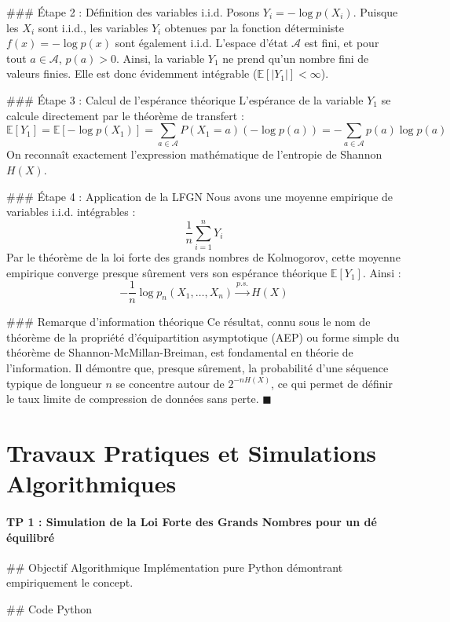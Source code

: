 \documentclass[11pt,a4paper]{article}
\begin{document}
\#\#\# Étape 2 : Définition des variables i.i.d.
Posons $Y_i = -\log p(X_i)$. Puisque les $X_i$ sont i.i.d., les variables $Y_i$ obtenues par la fonction déterministe $f(x) = -\log p(x)$ sont également i.i.d.
L'espace d'état $\mathcal{A}$ est fini, et pour tout $a \in \mathcal{A}$, $p(a) > 0$. Ainsi, la variable $Y_1$ ne prend qu'un nombre fini de valeurs finies. Elle est donc évidemment intégrable ($\mathbb{E}[|Y_1|] < \infty$).

\#\#\# Étape 3 : Calcul de l'espérance théorique
L'espérance de la variable $Y_1$ se calcule directement par le théorème de transfert :
$$ \mathbb{E}[Y_1] = \mathbb{E}[-\log p(X_1)] = \sum_{a \in \mathcal{A}} P(X_1 = a) (-\log p(a)) = -\sum_{a \in \mathcal{A}} p(a) \log p(a) $$
On reconnaît exactement l'expression mathématique de l'entropie de Shannon $H(X)$.

\#\#\# Étape 4 : Application de la LFGN
Nous avons une moyenne empirique de variables i.i.d. intégrables :
$$ \frac{1}{n} \sum_{i=1}^n Y_i $$
Par le théorème de la loi forte des grands nombres de Kolmogorov, cette moyenne empirique converge presque sûrement vers son espérance théorique $\mathbb{E}[Y_1]$.
Ainsi :
$$ -\frac{1}{n} \log p_n(X_1, \dots, X_n) \xrightarrow{p.s.} H(X) $$

\#\#\# Remarque d'information théorique
Ce résultat, connu sous le nom de théorème de la propriété d'équipartition asymptotique (AEP) ou forme simple du théorème de Shannon-McMillan-Breiman, est fondamental en théorie de l'information. Il démontre que, presque sûrement, la probabilité d'une séquence typique de longueur $n$ se concentre autour de $2^{-n H(X)}$, ce qui permet de définir le taux limite de compression de données sans perte. $\blacksquare$




\newpage
\part{Travaux Pratiques et Simulations Algorithmiques}
\subsection*{TP 1 : Simulation de la Loi Forte des Grands Nombres pour un dé équilibré}

\#\# Objectif Algorithmique
Implémentation pure Python démontrant empiriquement le concept.

\#\# Code Python
\end{document}

